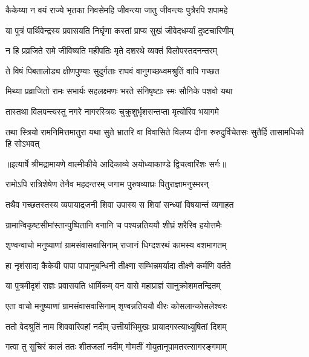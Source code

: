 \twolineshloka
{कैकेय्या न वयं राज्ये भृतका निवसेमहि}
{जीवन्त्या जातु जीवन्त्यः पुत्रैरपि शपामहे} %

\twolineshloka
{या पुत्रं पार्थिवेन्द्रस्य प्रवासयति निर्घृणा}
{कस्तां प्राप्य सुखं जीवेदधर्म्यां दुष्टचारिणीम्} %

\twolineshloka
{न हि प्रव्रजिते रामे जीविष्यति महीपतिः}
{मृते दशरथे व्यक्तं विलोपस्तदनन्तरम्} %

\twolineshloka
{ते विषं पिबतालोड्य क्षीणपुण्याः सुदुर्गताः}
{राघवं वानुगच्छध्वमश्रुतिं वापि गच्छत} %

\twolineshloka
{मिथ्या प्रव्राजितो रामः सभार्यः सहलक्ष्मणः}
{भरते संनिषृष्टाः स्मः सौनिके पशवो यथा} %

\twolineshloka
{तास्तथा विलपन्त्यस्तु नगरे नागरस्त्रियः}
{चुक्रुशुर्भृशसन्तप्ता मृत्योरिव भयागमे} %

\fourlineindentedshloka
{तथा स्त्रियो रामनिमित्तमातुरा}
{यथा सुते भ्रातरि वा विवासिते}
{विलप्य दीना रुरुदुर्विचेतसः}
{सुतैर्हि तासामधिको हि सोऽभवत्} %


{॥इत्यार्षे श्रीमद्रामायणे वाल्मीकीये आदिकाव्ये अयोध्याकाण्डे द्विचत्वारिंशः सर्गः॥}


\twolineshloka
{रामोऽपि रात्रिशेषेण तेनैव महदन्तरम्}
{जगाम पुरुषव्याघ्रः पितुराज्ञामनुस्मरन्} %

\twolineshloka
{तथैव गच्छतस्तस्य व्यपायाद्रजनी शिवा}
{उपास्य स शिवां सन्ध्यां विषयान्तं व्यगाहत} %

\twolineshloka
{ग्रामान्विकृष्टसीमांस्तान्पुष्पितानि वनानि च}
{पश्यन्नतिययौ शीघ्रं शरैरिव हयोत्तमैः} %

\twolineshloka
{शृण्वन्वाचो मनुष्याणां ग्रामसंवासवासिनाम्}
{राजानं धिग्दशरथं कामस्य वशमागतम्} %

\twolineshloka
{हा नृशंसाद्य कैकेयी पापा पापानुबन्धिनी}
{तीक्ष्णा सम्भिन्नमर्यादा तीक्ष्णे कर्मणि वर्तते} %

\twolineshloka
{या पुत्रमीदृशं राज्ञः प्रवासयति धार्मिकम्}
{वन वासे महाप्राज्ञं सानुक्रोशमतन्द्रितम्} %

\twolineshloka
{एता वाचो मनुष्याणां ग्रामसंवासवासिनाम्}
{शृण्वन्नतिययौ वीरः कोसलान्कोसलेश्वरः} %

\twolineshloka
{ततो वेदश्रुतिं नाम शिववारिवहां नदीम्}
{उत्तीर्याभिमुखः प्रायादगस्त्याध्युषितां दिशम्} %

\twolineshloka
{गत्वा तु सुचिरं कालं ततः शीतजलां नदीम्}
{गोमतीं गोयुतानूपामतरत्सागरङ्गमाम्} %

